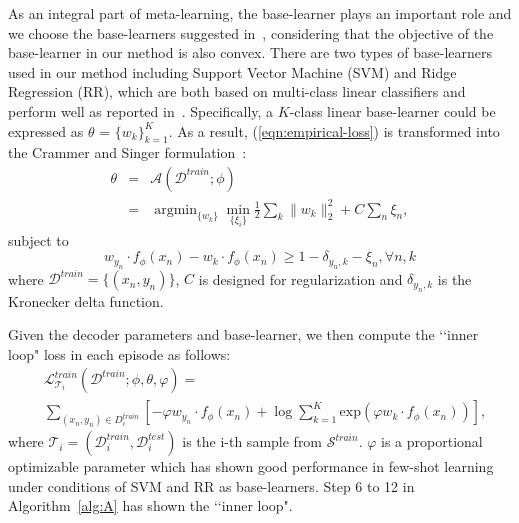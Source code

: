 \documentclass[10pt,conference,a4paper]{IEEEtran}
\begin{document}
As an integral part of meta-learning, the base-learner plays an important role and we choose the base-learners suggested in~\cite{lee2019meta}, considering that the objective of the base-learner in our method is also convex. There are two types of base-learners used in our method including Support Vector Machine (SVM) and Ridge Regression (RR), which are both based on multi-class linear classifiers and perform well as reported in~\cite{lee2019meta}. Specifically, a $\mathit{K}$-class linear base-learner could be expressed as $\theta$ = $\{w_{k}\}_{k = 1}^{K}$. As a result, (\ref{eqn:empirical-loss}) is transformed into the Crammer and Singer formulation~\cite{crammer2001algorithmic}: 
\begin{eqnarray}
\theta \! & = & \!\mathcal{A} (\mathcal{D}^{train}; \phi) \nonumber\\
\! & = & \!\mathop{\arg\min}_{\{w_{k}\}}\mathop{\min}_{\{\xi_{i}\}}\frac{1}{2} \sum_{k} \|w_{k}\|_{2}^{2} + C\sum_{n}\xi_{n}, 
\end{eqnarray}
subject to 
\[w_{y_{n}} \cdot f_{\phi} (x_{n}) - w_{k} \cdot f_{\phi} (x_{n}) \geq 1 - \delta_{y_{n}, k} - \xi_{n}, \forall n, k\]
where $\mathcal{D}^{train} = \{ (x_{n}, y_{n})\}$, $C$ is designed for regularization and $\delta_{y_{n}, k}$ is the Kronecker delta function.

Given the decoder parameters and base-learner, we then compute the ‘‘inner loop" loss in each episode as follows: 
\begin{equation}
\label{eqn:inner-loop-loss}
\begin{split}
& \mathcal{L}_{\mathcal{T}_{i}}^{train} (\mathcal{D}^{train}; \phi, \theta, \varphi) =\\& \sum_{ (x_{n}, y_{n})\in D^{train}_{i}}\![-\varphi w_{y_{n}}\!\cdot\!f_{\phi} (x_{n}) + \mathrm{\log}\!\sum_{k = 1}^{K}\mathrm{exp} (\varphi w_{k}\!\cdot\!f_{\phi} (x_{n}))], 
\end{split}
\end{equation}
where $\mathcal{T}_{i} = (\mathcal{D}^{train}_{i}, \mathcal{D}^{test}_{i})$ is the i-th sample from $\mathcal{S}^{train}$. $\varphi$ is a proportional optimizable parameter which has shown good performance in few-shot learning~\cite{bertinetto2019meta, oreshkin2018tadam} under conditions of SVM and RR as base-learners. Step 6 to 12 in Algorithm~\ref{alg:A} has shown the ‘‘inner loop".
\end{document}
